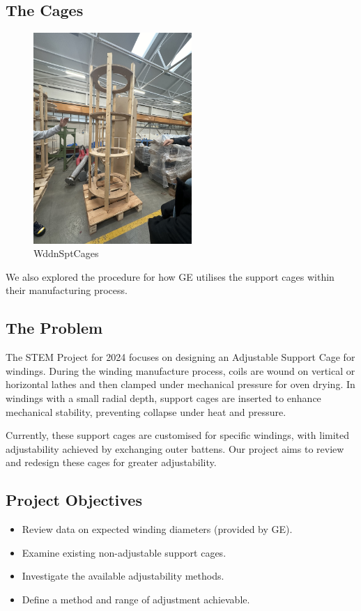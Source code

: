\documentclass[a4paper,10pt]{article}
\begin{document}
\subsection{The Cages}
\begin{figure}[H]
  \centering
  \includegraphics[width=6cm, angle=270]{wooden-support-cage}
  \caption{\gls{WddnSptCages}}
  \label{fig:wooden-support-cage}
\end{figure}

We also explored the procedure for how \gls{GE} utilises the support cages within their manufacturing process.

\subsection{The Problem}
The STEM Project for 2024 focuses on designing an Adjustable Support Cage for windings. During the winding manufacture process, coils are wound on vertical or horizontal lathes and then clamped under mechanical pressure for oven drying. In windings with a small radial depth, support cages are inserted to enhance mechanical stability, preventing collapse under heat and pressure.

Currently, these support cages are customised for specific windings, with limited adjustability achieved by exchanging outer battens. Our project aims to review and redesign these cages for greater adjustability.

\subsection{Project Objectives}
\begin{itemize}
  \item Review data on expected winding diameters (provided by \gls{GE}).
  \item Examine existing non-adjustable support cages.
  \item Investigate the available adjustability methods.
  \item Define a method and range of adjustment achievable.
\end{itemize}
\end{document}
